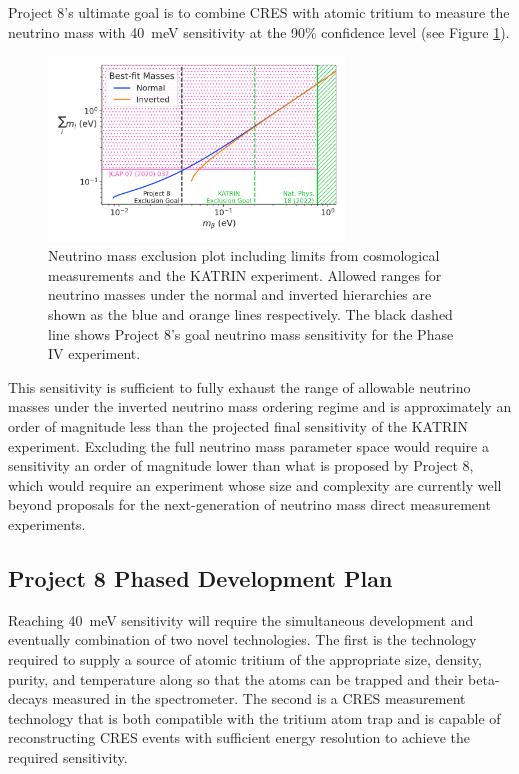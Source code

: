 Project 8's ultimate goal is to combine CRES with atomic tritium to measure the neutrino mass with 40~meV sensitivity at the 90\% confidence level (see Figure \ref{fig:chap3-p8-nu-mass-goal}).
\begin{figure}[htbp]
    \centering
    \includegraphics[width=0.7\textwidth]{figs/Chapter-3/230303_sum_nu_mass_vs_m_beta_with_exclusion_and_goal.png}
    \caption{Neutrino mass exclusion plot including limits from cosmological measurements and the KATRIN experiment. Allowed ranges for neutrino masses under the normal and inverted hierarchies are shown as the blue and orange lines respectively. The black dashed line shows Project 8's goal neutrino mass sensitivity for the Phase IV experiment.}
    \label{fig:chap3-p8-nu-mass-goal}
\end{figure}
This sensitivity is sufficient to fully exhaust the range of allowable neutrino masses under the inverted neutrino mass ordering regime and is approximately an order of magnitude less than the projected final sensitivity of the KATRIN experiment. Excluding the full neutrino mass parameter space would require a sensitivity an order of magnitude lower than what is proposed by Project 8, which would require an experiment whose size and complexity are currently well beyond proposals for the next-generation of neutrino mass direct measurement experiments.

\subsection{Project 8 Phased Development Plan}

Reaching 40~meV sensitivity will require the simultaneous development and eventually combination of two novel technologies. The first is the technology required to supply a source of atomic tritium of the appropriate size, density, purity, and temperature along so that the atoms can be trapped and their beta-decays measured in the spectrometer. The second is a CRES measurement technology that is both compatible with the tritium atom trap and is capable of reconstructing CRES events with sufficient energy resolution to achieve the required sensitivity.


